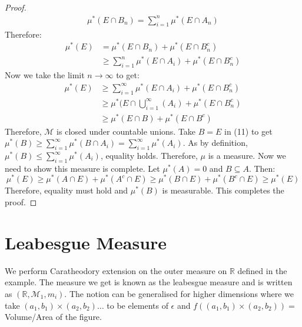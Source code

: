 \documentclass[oneside]{article}
\begin{document}
\begin{proof}
    \begin{align}
        \mu^*(E\cap B_n)=\sum_{i=1}^n\mu^*(E\cap A_n)    
    \end{align}
    Therefore:
    \begin{align}
        \mu^*(E)&=\mu^*(E\cap B_n)+\mu^*(E\cap B_n^c)\\
        &\geq \sum_{i=1}^n\mu^*(E\cap A_i)+\mu^*(E\cap B_n^c)
    \end{align}
    Now we take the limit $n\to\infty$ to get:
    \begin{align}
        \mu^*(E)&\geq \sum_{i=1}^\infty\mu^*(E\cap A_i)+\mu^*(E\cap B_n^c)\\
        &\geq \mu^*(E\cap \bigcup_{i=1}^\infty(A_i)+\mu^*(E\cap B_n^c)\\
        &\geq\mu^*(E\cap B)+\mu^*(E\cap B^c)
    \end{align}
    Therefore, $\mathcal{M}$ is closed under countable unions. Take $B=E$ in (11) to get
    $\mu^*(B)\geq \sum_{i=1}^\infty \mu^*(B\cap A_i)=\sum_{i=1}^\infty \mu^*(A_i)$. As by definition, $\mu^*(B)\leq \sum_{i=1}^\infty \mu^*(A_i)$, equality holds. Therefore, $\mu$ is a measure. Now we need to show this measure is complete. Let $\mu^*(A)=0$ and $B\subseteq A$. Then:
    $$\mu^*(E)\geq \mu^*(A\cap E)+\mu^*(A^c\cap E)\geq \mu^*(B\cap E)+\mu^*(B^c\cap E)\geq \mu^*(E)$$
    Therefore, equality must hold and $\mu^*(B)$ is measurable. This completes the proof.
\end{proof}
\section{Leabesgue Measure}
We perform Caratheodory extension on the outer measure on $\mathbb R$ defined in the example. The measure we get is known as the leabesgue measure and is written as $(\mathbb{R},\mathcal{M}_1,m_i)$. The notion can be generalised for higher dimensions where we take $(a_1,b_1)\times (a_2,b_2)\hdots $ to be elements of $\epsilon$ and $f((a_1,b_1)\times (a_2,b_2))=$Volume/Area of the figure. 
\end{document}
